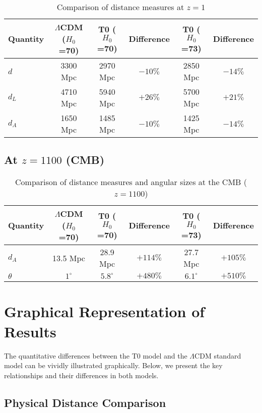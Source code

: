 \documentclass[a4paper,12pt]{article}
\theoremstyle{definition}
\theoremstyle{remark}
\begin{document}
	\begin{table}[h]
		\centering
		\begin{tabular}{|l|c|c|c|c|c|}
			\hline
			\textbf{Quantity} & \textbf{$\Lambda$CDM ($H_0$=70)} & \textbf{T0 ($H_0$=70)} & \textbf{Difference} & \textbf{T0 ($H_0$=73)} & \textbf{Difference} \\
			\hline
			$d$ & 3300 Mpc & 2970 Mpc & $-10\%$ & 2850 Mpc & $-14\%$ \\
			$d_L$ & 4710 Mpc & 5940 Mpc & $+26\%$ & 5700 Mpc & $+21\%$ \\
			$d_A$ & 1650 Mpc & 1485 Mpc & $-10\%$ & 1425 Mpc & $-14\%$ \\
			\hline
		\end{tabular}
		\caption{Comparison of distance measures at $z = 1$}
	\end{table}
	
	\subsection{At $z = 1100$ (CMB)}
	
	\begin{table}[h]
		\centering
		\begin{tabular}{|l|c|c|c|c|c|}
			\hline
			\textbf{Quantity} & \textbf{$\Lambda$CDM ($H_0$=70)} & \textbf{T0 ($H_0$=70)} & \textbf{Difference} & \textbf{T0 ($H_0$=73)} & \textbf{Difference} \\
			\hline
			$d_A$ & 13.5 Mpc & 28.9 Mpc & $+114\%$ & 27.7 Mpc & $+105\%$ \\
			$\theta$ & $1^\circ$ & $5.8^\circ$ & $+480\%$ & $6.1^\circ$ & $+510\%$ \\
			\hline
		\end{tabular}
		\caption{Comparison of distance measures and angular sizes at the CMB ($z = 1100$)}
	\end{table}
	
	\section{Graphical Representation of Results}
	
	The quantitative differences between the T0 model and the $\Lambda$CDM standard model can be vividly illustrated graphically. Below, we present the key relationships and their differences in both models.
	
	\subsection{Physical Distance Comparison}
	
\end{document}
